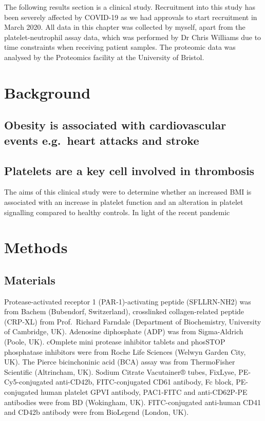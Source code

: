 \documentclass[11pt,twoside]{bristolthesis}
\begin{document}
The following results section is a clinical study. Recruitment into this study has been severely affected by COVID-19 as we had approvals to start recruitment in March 2020. All data in this chapter was collected by myself, apart from the platelet-neutrophil assay data, which was performed by Dr Chris Williams due to time constraints when receiving patient samples. The proteomic data was analysed by the Proteomics facility at the University of Bristol.

\hypertarget{background-3}{%
\section{Background}\label{background-3}}

\hypertarget{obesity-is-associated-with-cardiovascular-events-e.g.-heart-attacks-and-stroke}{%
\subsection{Obesity is associated with cardiovascular events e.g.~heart attacks and stroke}\label{obesity-is-associated-with-cardiovascular-events-e.g.-heart-attacks-and-stroke}}

\hypertarget{platelets-are-a-key-cell-involved-in-thrombosis}{%
\subsection{Platelets are a key cell involved in thrombosis}\label{platelets-are-a-key-cell-involved-in-thrombosis}}

The aims of this clinical study were to determine whether an increased BMI is associated with an increase in platelet function and an alteration in platelet signalling compared to healthy controls. In light of the recent pandemic

\hypertarget{methods-1}{%
\section{Methods}\label{methods-1}}

\hypertarget{materials}{%
\subsection{Materials}\label{materials}}

Protease-activated receptor 1 (PAR-1)-activating peptide (SFLLRN-NH2) was from Bachem (Bubendorf, Switzerland), crosslinked collagen-related peptide (CRP-XL) from Prof.~Richard Farndale (Department of Biochemistry, University of Cambridge, UK). Adenosine diphosphate (ADP) was from Sigma-Aldrich (Poole, UK). cOmplete mini protease inhibitor tablets and phosSTOP phosphatase inhibitors were from Roche Life Sciences (Welwyn Garden City, UK). The Pierce bicinchoninic acid (BCA) assay was from ThermoFisher Scientific (Altrincham, UK). Sodium Citrate Vacutainer® tubes, FixLyse, PE-Cy5-conjugated anti-CD42b, FITC-conjugated CD61 antibody, Fc block, PE-conjugated human platelet GPVI antibody, PAC1-FITC and anti-CD62P-PE antibodies were from BD (Wokingham, UK). FITC-conjugated anti-human CD41 and CD42b antibody were from BioLegend (London, UK).
\end{document}
